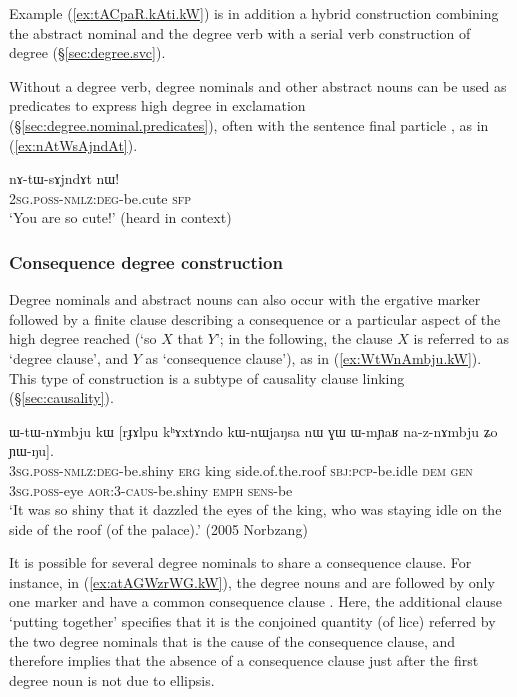 Example (\ref{ex:tACpaR.kAti.kW}) is in addition a hybrid construction combining the abstract nominal and the degree verb with a serial verb construction of degree (§\ref{sec:degree.svc}).

Without a degree verb, degree nominals and other abstract nouns can be used as predicates to express high degree in exclamation (§\ref{sec:degree.nominal.predicates}), often with the sentence final particle , as in (\ref{ex:nAtWsAjndAt}).

\begin{exe}
\ex \label{ex:nAtWsAjndAt}
\gll nɤ-tɯ-sɤjndɤt nɯ! \\
\textsc{2sg}.\textsc{poss}-\textsc{nmlz}:\textsc{deg}-be.cute \textsc{sfp} \\
\glt `You are so cute!' (heard in context)
\end{exe}



\subsubsection{Consequence degree construction} \label{sec:degree.consequence}
Degree nominals and abstract nouns can also occur with the ergative marker  followed by a finite clause describing a consequence or a particular aspect of the high degree reached (`so $X$ that $Y$'; in the following, the clause $X$ is referred to as `degree clause', and $Y$ as `consequence clause'), as in (\ref{ex:WtWnAmbju.kW}). This type of construction is a subtype of causality clause linking (§\ref{sec:causality}).

\begin{exe}
\ex \label{ex:WtWnAmbju.kW}
\gll ɯ-tɯ-nɤmbju kɯ [rɟɤlpu kʰɤxtɤndo kɯ-nɯjaŋsa nɯ ɣɯ ɯ-mɲaʁ na-z-nɤmbju ʑo ɲɯ-ŋu]. \\
\textsc{3sg}.\textsc{poss}-\textsc{nmlz}:\textsc{deg}-be.shiny \textsc{erg} king side.of.the.roof \textsc{sbj}:\textsc{pcp}-be.idle \textsc{dem} \textsc{gen} \textsc{3sg}.\textsc{poss}-eye \textsc{aor}:3\flobv{}-\textsc{caus}-be.shiny \textsc{emph} \textsc{sens}-be\\
\glt `It was so shiny that it dazzled the eyes of the king, who was staying idle on the side of the roof (of the palace).' (2005 Norbzang)
\end{exe}

It is possible for several degree nominals to share a consequence clause. For instance, in (\ref{ex:atAGWzrWG.kW}), the degree nouns  and  are followed by only one marker  and have a common consequence clause . Here, the additional clause  `putting together' specifies that it is the conjoined quantity (of lice) referred by the two degree nominals that is the cause of the consequence clause, and therefore implies that the absence of a consequence clause just after the first degree noun  is not due to ellipsis.

